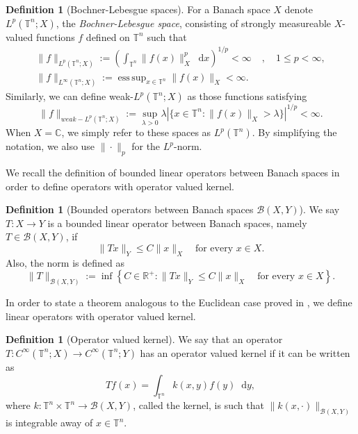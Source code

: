 \documentclass[12pt, reqno]{amsart}
\theoremstyle{definition}
\newtheorem{definition}[theorem]{Definition}
\theoremstyle{remark}
\numberwithin{equation}{section}
\newcommand*\diff{\mathop{}\!\mathrm{d}}
\DeclareMathOperator*{\esssup}{ess\,sup}
\begin{document}
\begin{definition}[Bochner-Lebesgue spaces]
    \cite[pp.~9]{defrancia} For a Banach space $X$ denote $L^p(\mathbb{T}^n;X)$, the \textit{Bochner-Lebesgue space}, consisting of strongly measureable $X$-valued functions $f$ defined on $\mathbb{T}^n$ such that 
    \begin{align*}
        \|f\|_{L^p(\mathbb{T}^n;X)} := \left( \int_{\mathbb{T}^n} \|f(x)\|_X^p \diff x \right)^{1/p} < \infty \; &, \quad 1\leq p < \infty,\\ 
        \|f\|_{L^\infty(\mathbb{T}^n;X)} := \esssup_{x \in \mathbb{T}^n} \|f(x)\|_X  < \infty. &
    \end{align*}
    Similarly, we can define weak-$L^p(\mathbb{T}^n;X)$ as those functions satisfying
    \begin{equation*}
        \|f\|_{weak-L^p(\mathbb{T}^n;X)} := \sup_{\lambda > 0} \lambda|\{x \in \mathbb{T}^n : \|f(x)\|_X > \lambda \}|^{1/p} < \infty.
    \end{equation*}
    When $X = \mathbb{C}$, we simply refer to these spaces as $L^p(\mathbb{T}^n).$ By simplifying the notation, we also use $\|\cdot\|_p$ for the $L^p$-norm.
    \label{def:bochner-lebesgue}
\end{definition}
We recall the definition of bounded linear operators between Banach spaces in order to define operators with operator valued kernel.
\begin{definition}[Bounded operators between Banach spaces $\mathcal{B}(X,Y)$]
    We say $T:X\rightarrow Y$ is a bounded linear operator between Banach spaces, namely $T \in \mathcal{B}(X, Y)$, if 
    \begin{equation*}
        \|Tx\|_Y \leq C\|x\|_X  \quad \text{for every } x\in X.
    \end{equation*}
    Also, the norm is defined as 
    \begin{equation*}
        \|T\|_{\mathcal{B}(X,Y)} := \inf \left\{ C \in \mathbb{R}^+ :  \|Tx\|_Y \leq C\|x\|_X \quad \text{for every } x\in X \right\}.
    \end{equation*}
\end{definition}
In order to state a theorem analogous to the Euclidean case proved in \cite[Theorem~4.1]{alvarez-milman}, we define linear operators with operator valued kernel.
\begin{definition}[Operator valued kernel]
\cite[pp.~29]{defrancia} We say that an operator $T:C^\infty(\mathbb{T}^n;X)\rightarrow C^\infty(\mathbb{T}^n;Y)$ has an operator valued kernel if it can be written as 
\begin{equation*}
    Tf(x) = \int_{\mathbb{T}^n}k(x, y)f(y)\diff y,
\end{equation*}
 where $k:\mathbb{T}^n \times \mathbb{T}^n \rightarrow \mathcal{B}(X,Y)$, called the kernel, is such that $\|k(x, \cdot)\|_{\mathcal{B}(X,Y)}$ is integrable away of $x \in \mathbb{T}^n $.
    \label{def:operator-kernel}
\end{definition}
\end{document}
